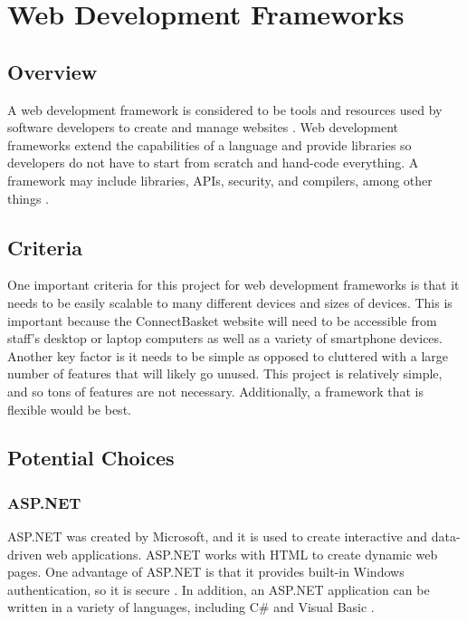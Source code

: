 \documentclass[onecolumn, draftclsnofoot,10pt, compsoc]{IEEEtran}
\begin{document}
\section{Web Development Frameworks}

\subsection{Overview}
A web development framework is considered to be tools and resources used by software developers to create and manage websites \cite{webdevframework}. Web development frameworks extend the capabilities of a language and provide libraries so developers do not have to start from scratch and hand-code everything. A framework may include libraries, APIs, security, and compilers, among other things \cite{framework}.

\subsection{Criteria}
One important criteria for this project for web development frameworks is that it needs to be easily scalable to many different devices and sizes of devices. This is important because the ConnectBasket website will need to be accessible from staff's desktop or laptop computers as well as a variety of smartphone devices. Another key factor is it needs to be simple as opposed to cluttered with a large number of features that will likely go unused. This project is relatively simple, and so tons of features are not necessary. Additionally, a framework that is flexible would be best. 

\subsection{Potential Choices}

\subsubsection{ASP.NET} 
ASP.NET was created by Microsoft, and it is used to create interactive and data-driven web applications\cite{asp.net}. ASP.NET works with HTML to create dynamic web pages. One advantage of ASP.NET is that it provides built-in Windows authentication, so it is secure \cite{asp}. In addition, an ASP.NET application can be written in a variety of languages, including C\# and Visual Basic \cite{asp.net}. 
\end{document}
